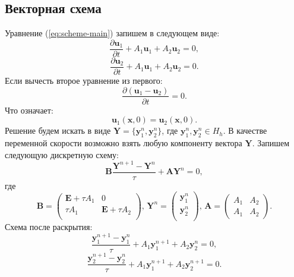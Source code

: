 \documentclass[12pt]{article}
\begin{document}
\subsection{Векторная схема}
Уравнение (\ref{eq:scheme-main}) запишем в следующем виде:
$$\frac{\partial {\bm u}_1}{\partial t} + A_1{\bm u}_1 + A_2{\bm u}_2 = 0,$$
$$\frac{\partial {\bm u}_2}{\partial t} + A_1{\bm u}_1 + A_2{\bm u}_2 = 0.$$
Если вычесть второе уравнение из первого:
$$
\frac{\partial ({\bm u}_1 - {\bm u}_2)}{\partial t} = 0.
$$
Что означает:
$${\bm u}_1 ({\bm x}, 0) = {\bm u}_2 ({\bm x}, 0).$$
Решение будем искать в виде ${\bm Y}=\{{\bm y}_1^n, {\bm y}_2^n\}$, где ${\bm y}_1^n, {\bm y}_2^n \in H_h$. В качестве переменной скорости возможно взять любую компоненту вектора ${\bm Y}$.
Запишем следующую дискретную схему:
$$
{\bm B}\frac{{\bm Y}^{n+1} - {\bm Y}^{n}}{\tau} + {\bm A} {\bm Y}^n = 0,
$$
где
$$
{\bm B} = \left( \begin{array}{cc}
{\bm E} + \tau A_1 & 0 \\
\tau A_1 & {\bm E} + \tau A_2 \\
\end{array} \right), \,
{\bm Y}^n = \left(\begin{array}{c}
{\bm y}_1^{n} \\
{\bm y}_2^{n} \\
\end{array}\right), \,
{\bm A} = \left(
\begin{array}{cc}
A_1 & A_2 \\
A_1 & A_2
\end{array}
\right).
$$
Схема после раскрытия:
\begin{equation}
\label{eq:scheme-vr-1}
\frac{{\bm y}_{1}^{n+1} - {\bm y}_{1}^{n} }{\tau} + A_1 {\bm y}_1^{n+1} + A_2 {\bm y}_2^n = 0,
\end{equation}
\begin{equation}
\label{eq:scheme-vr-2}
\frac{{\bm y}_{2}^{n+1} - {\bm y}_{2}^{n} }{\tau} + A_1 {\bm y}_1^{n+1} + A_2 {\bm y}_2^{n+1} = 0.
\end{equation}
\end{document}
